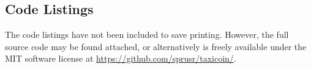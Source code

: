 \subsection*{Code Listings}

The code listings have not been included to save printing. However, the full source code may be found attached, or alternatively is freely available under the MIT software license at \url{https://github.com/sprusr/taxicoin/}.

%
%
%
%
%

